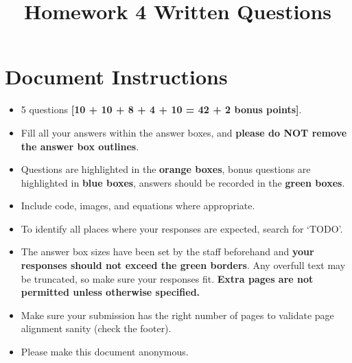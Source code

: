 \pagestyle{fancy}
\fancyhf{}


\date{}

\title{\vspace{-1cm}Homework 4 Written Questions}



\maketitle
\vspace{-3cm}
\thispagestyle{fancy}

\section*{ Document Instructions}
\begin{itemize}
  \item 5 questions \textbf{[10 + 10 + 8 + 4 + 10 = 42 + 2 bonus points]}.
  \item Fill all your answers within the answer boxes, and \textbf{please do NOT remove the answer box outlines}.
  \item Questions are highlighted in the \textbf{orange boxes}, bonus questions are highlighted in \textbf{blue boxes}, answers should be recorded in the \textbf{green boxes}.
  \item Include code, images, and equations where appropriate.
  \item To identify all places where your responses are expected, search for `TODO'.
  \item The answer box sizes have been set by the staff beforehand and \textbf{your responses should not exceed the green borders}. Any overfull text may be truncated, so make sure your responses fit. \textbf{Extra pages are not permitted unless otherwise specified.}
  \item Make sure your submission has the right number of pages to validate page alignment sanity (check the footer).
  \item Please make this document anonymous.
\end{itemize}

